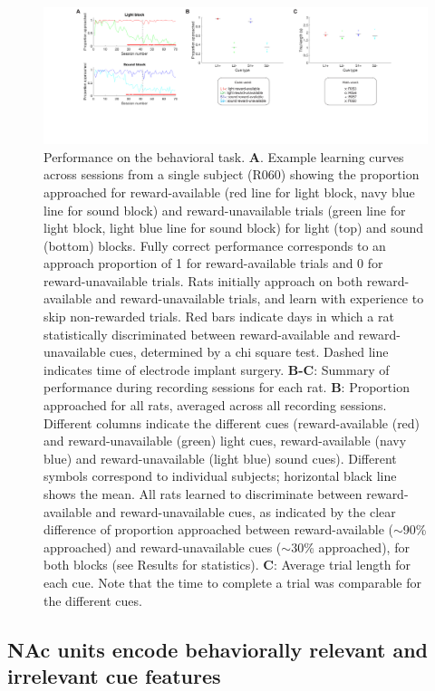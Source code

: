 \documentclass[11pt]{article}
\newcommand{\bsf}[1]{\textbf{#1}}
\providecommand{\DIFaddendFL}{} %
\DeclareRobustCommand{\DIFaddendFL}{\DIFOaddendFL \let\includegraphics\DIFOincludegraphics} %
\begin{document}
\begin{figure}[h]
\centering
\DIFaddendFL \includegraphics[width=\textwidth]{Fig 4 - Behavioral results.png}
\caption{Performance on the behavioral task. \bsf{A}. Example learning curves
across sessions from a single subject (R060) showing the proportion approached
for reward-available (red line for light block, navy blue line for sound
block) and reward-unavailable trials (green line for light block, light blue
line for sound block) for light (top) and sound (bottom) blocks. Fully correct performance corresponds to an approach
proportion of 1 for reward-available trials and 0 for reward-unavailable
trials. Rats initially approach on both reward-available and
reward-unavailable trials, and learn with experience to skip non-rewarded
trials. Red bars indicate days in which a rat statistically discriminated
between reward-available and reward-unavailable cues, determined by a chi
square test. Dashed line indicates time of electrode implant
surgery. \bsf{B-C}: Summary of performance during recording sessions for each
rat. \bsf{B}: Proportion approached for all rats, averaged across all
recording sessions. Different columns indicate the different cues
(reward-available (red) and reward-unavailable (green) light cues,
reward-available (navy blue) and reward-unavailable (light blue) sound
cues). Different symbols correspond to individual subjects; horizontal black
line shows the mean. All rats learned to discriminate between reward-available
and reward-unavailable cues, as indicated by the clear difference of
proportion approached between reward-available ($\sim$90\% approached) and
reward-unavailable cues ($\sim$30\% approached), for both blocks (see Results
for statistics). \bsf{C}: Average trial length for each cue. Note that the
time to complete a trial was comparable for the different cues.}
\label{fig:behav}
\end{figure}
\subsection*{NAc units encode behaviorally relevant and irrelevant cue features}
\end{document}
